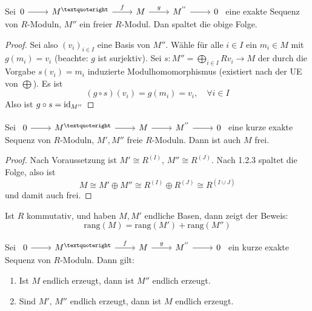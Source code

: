 \begin{sa}
	Sei$\begin{tikzcd}
	0  \arrow{r} & M^{’} \arrow{r}{f} & M \arrow{r}{g} & M^{''} \arrow{r} & 0
	\end{tikzcd} $ eine exakte Sequenz von $R$-Moduln, $M''$ ein freier $R$-Modul. Dan spaltet die obige Folge.
\end{sa}
\begin{proof}
	Sei also $(v_i)_{i\in I}$ eine Basis von $M''$. Wähle für alle $i\in I$ ein $m_i\in M$ mit $g(m_i) = v_i$ (beachte: $g$ ist surjektiv). Sei $s:M'' = \bigoplus_{i\in I} Rv_i \to M$ der durch die Vorgabe $s(v_i) = m_i$ induzierte Modulhomomorphismus (existiert nach der UE von $\bigoplus$). Es ist 
	$$(g\circ s) (v_i) = g(m_i) = v_i, \quad \forall i\in I$$
	Also ist $g\circ s = \operatorname{\text{id}}_{M''}$
\end{proof}
\begin{fo}
	Sei $\begin{tikzcd}
	0  \arrow{r} & M^{’} \arrow{r} & M \arrow{r} & M^{''} \arrow{r} & 0
	\end{tikzcd} $ eine kurze exakte Sequenz von $R$-Moduln, $M', M''$ freie $R$-Moduln. Dann ist auch $M$ frei.
\end{fo}
\begin{proof}
	Nach Voraussetzung ist $M' \cong R^{(I)}$, $M'' \cong R^{(J)}$. Nach 1.2.3 spaltet die Folge, also ist 
	$$M  \cong M'\oplus M'' \cong R^{(I)} \oplus R^{(J)} \cong R^{(I \overset{\cdot}{\cup} J)}$$ und damit auch frei.
\end{proof}
\begin{anm}
	Ist $R$ kommutativ, und haben $M,M'$ endliche Basen, dann zeigt der Beweis: 
	$$\text{rang}(M) = \text{rang}(M') + \text{rang}(M'')$$
\end{anm}
\begin{bem}
	Sei $\begin{tikzcd}
	0  \arrow{r} & M^{’} \arrow{r}{f} & M \arrow{r}{g} & M^{''} \arrow{r} & 0
	\end{tikzcd} $ ein kurze exakte Sequenz von $R$-Moduln. Dann gilt: 
	\begin{enumerate}[label= \alph*)]
		\item Ist $M$ endlich erzeugt, dann ist $M''$ endlich erzeugt.
		\item Sind $M', \, M''$ endlich erzeugt, dann ist $M$ endlich erzeugt.
	\end{enumerate}
\end{bem}
